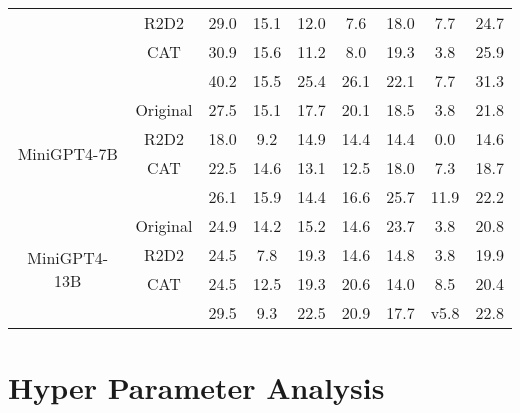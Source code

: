 \begin{table*}[t]
\begin{tabular}{c|c|ccccccc}
&R2D2     & 29.0 &15.1 &12.0 &7.6  &18.0  &7.7  &24.7 \\
&CAT    & 30.9 &15.6  &11.2  &8.0  &19.3  & 3.8 &  25.9 \\
&\cellcolor{gray!15}{\name} & \cellcolor{gray!15}40.2 &\cellcolor{gray!15}15.5  &\cellcolor{gray!15}25.4  &\cellcolor{gray!15}26.1  &\cellcolor{gray!15}22.1  &\cellcolor{gray!15}7.7   &\cellcolor{gray!15}31.3 
\\ \hline \hline
\multirow{4}{*}{MiniGPT4-7B}
&Original & 27.5 &15.1 &17.7 &20.1 &18.5  &3.8  &21.8 \\
&R2D2     & 18.0 &9.2  &14.9 &14.4 &14.4  &0.0  &14.6 \\
&CAT    & 22.5 &14.6 &13.1 &12.5 &18.0  &7.3  &18.7 \\
&\cellcolor{gray!15}{\name} & \cellcolor{gray!15}26.1 &\cellcolor{gray!15}15.9 &\cellcolor{gray!15}14.4  &\cellcolor{gray!15}16.6  &\cellcolor{gray!15}25.7  &\cellcolor{gray!15}11.9  &\cellcolor{gray!15}22.2 
\\ \hline \hline
\multirow{4}{*}{MiniGPT4-13B}
&Original & 24.9 &14.2  &15.2  &14.6  &23.7  &3.8  &20.8 \\
&R2D2     & 24.5 &7.8  &19.3  &14.6  &14.8   &3.8   &19.9 \\
&CAT    & 24.5 &12.5  &19.3  &20.6  &14.0   &8.5   &20.4 \\
&\cellcolor{gray!15}{\name} & 29.5  &\cellcolor{gray!15}9.3  &\cellcolor{gray!15}22.5  &\cellcolor{gray!15}20.9  &\cellcolor{gray!15}17.7   &v5.8   &\cellcolor{gray!15}22.8  \\
\bottomrule
\end{tabular}
\label{tab:mmvet_utility}
\end{table*}


 








\section{Hyper Parameter Analysis}\label{app:hyperparameter}

